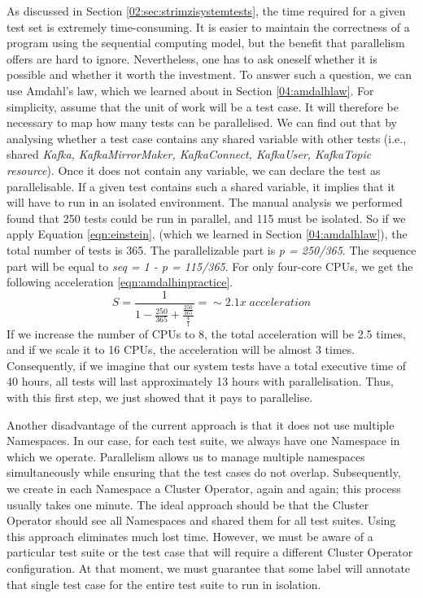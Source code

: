 As discussed in Section \ref{02:sec:strimzisystemtests}, the time required for a given test set is extremely time-consuming.
It is easier to maintain the correctness of a program using the sequential computing model, but the benefit that parallelism offers are hard to ignore.
Nevertheless, one has to ask oneself whether it is possible and whether it worth the investment.
To answer such a question, we can use Amdahl's law, which we learned about in Section \ref{04:amdalhlaw}.
For simplicity, assume that the unit of work will be a test case.
It will therefore be necessary to map how many tests can be parallelised.
We can find out that by analysing whether a test case contains any shared variable with other tests (i.e., shared \emph{Kafka, KafkaMirrorMaker, KafkaConnect, KafkaUser, KafkaTopic resource}).
Once it does not contain any variable, we can declare the test as parallelisable.
If a given test contains such a shared variable, it implies that it will have to run in an isolated environment.
The manual analysis we performed found that 250 tests could be run in parallel, and 115 must be isolated.
So if we apply Equation \eqref{eqn:einstein}, (which we learned in Section \ref{04:amdalhlaw}), the total number of tests is 365.
The parallelizable part is \emph{p = 250/365}.
The sequence part will be equal to \emph{seq = 1 - p = 115/365}.
For only four-core CPUs, we get the following acceleration \eqref{eqn:amdalhinpractice}.
\begin{equation}
    \label{eqn:amdalhinpractice}
    S = \frac{1}{1 - \frac{250}{365} + \frac{\frac{250}{365}}{\frac{4}{1}}} =\sim 2.1x \; acceleration
    \tag{3}
\end{equation}
If we increase the number of CPUs to 8, the total acceleration will be 2.5 times, and if we scale it to 16 CPUs, the acceleration will be almost 3 times.
Consequently, if we imagine that our system tests have a total executive time of 40 hours, all tests will last approximately 13 hours with parallelisation.
Thus, with this first step, we just showed that it pays to parallelise.

Another disadvantage of the current approach is that it does not use multiple Namespaces.
In our case, for each test suite, we always have one Namespace in which we operate.
Parallelism allows us to manage multiple namespaces simultaneously while ensuring that the test cases do not overlap.
Subsequently, we create in each Namespace a Cluster Operator, again and again;
this process usually takes one minute.
The ideal approach should be that the Cluster Operator should see all Namespaces and shared them for all test suites.
Using this approach eliminates much lost time.
However, we must be aware of a particular test suite or the test case that will require a different Cluster Operator configuration.
At that moment, we must guarantee that some label will annotate that single test case for the entire test suite to run in isolation.

